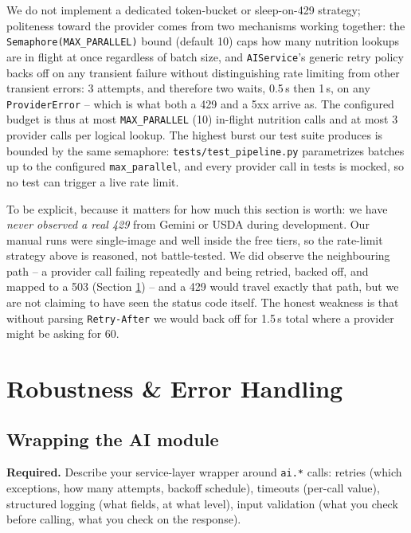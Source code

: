 \documentclass[11pt,a4paper]{article}
\newenvironment{deliverbox}{\begin{deliverboxshown}}{\end{deliverboxshown}}
\newenvironment{deliverbox}{\setbox0\vbox\bgroup}{\egroup\ignorespacesafterend}
\begin{document}
\par\noindent
We do not implement a dedicated token-bucket or sleep-on-429 strategy;
politeness toward the provider comes from two mechanisms working together:
the \texttt{Semaphore(MAX\_PARALLEL)} bound (default 10) caps how many
nutrition lookups are in flight at once regardless of batch size, and
\texttt{AIService}'s generic retry policy backs off on any transient
failure without distinguishing rate limiting from other transient errors:
3 attempts, and therefore two waits, 0.5\,s then 1\,s, on any
\texttt{ProviderError} -- which is what both a 429 and a 5xx arrive as.
The configured budget is thus at most \texttt{MAX\_PARALLEL} (10) in-flight
nutrition calls and at most 3 provider calls per logical lookup. The
highest burst our test suite produces is bounded by the same semaphore:
\texttt{tests/test\_pipeline.py} parametrizes batches up to the configured
\texttt{max\_parallel}, and every provider call in tests is mocked, so no
test can trigger a live rate limit.

\par\noindent
To be explicit, because it matters for how much this section is worth: we
have \emph{never observed a real 429} from Gemini or USDA during
development. Our manual runs were single-image and well inside the free
tiers, so the rate-limit strategy above is reasoned, not battle-tested. We
did observe the neighbouring path -- a provider call failing repeatedly
and being retried, backed off, and mapped to a 503 (Section
\ref{sec:robustness}) -- and a 429 would travel exactly that path, but we
are not claiming to have seen the status code itself. The honest weakness
is that without parsing \texttt{Retry-After} we would back off for 1.5\,s
total where a provider might be asking for 60.

\section{Robustness \& Error Handling}\label{sec:robustness}

\subsection{Wrapping the AI module}

\begin{deliverbox}
\textbf{Required.} Describe your service-layer wrapper around \texttt{ai.*} calls: retries (which exceptions, how many attempts, backoff schedule), timeouts (per-call value), structured logging (what fields, at what level), input validation (what you check before calling, what you check on the response).
\end{deliverbox}
\end{document}
